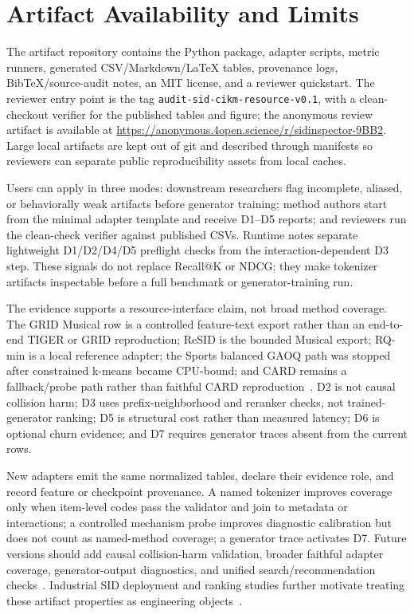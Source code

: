 \section{Artifact Availability and Limits}

The artifact repository contains the \tool Python package, adapter scripts,
metric runners, generated CSV/Markdown/\LaTeX{} tables, provenance logs,
BibTeX/source-audit notes, an MIT license, and a reviewer quickstart. The
reviewer entry point is the tag
\texttt{audit-sid-cikm-resource-v0.1}, with a clean-checkout verifier for the
published tables and figure; the anonymous review artifact is available at
\url{https://anonymous.4open.science/r/sidinspector-9BB2}. Large local artifacts are kept out of git and
described through manifests so reviewers can separate public reproducibility
assets from local caches.

Users can apply \tool in three modes: downstream researchers flag incomplete,
aliased, or behaviorally weak artifacts before generator training; method
authors start from the minimal adapter template and receive D1--D5 reports; and
reviewers run the clean-check verifier against published CSVs. Runtime notes
separate lightweight D1/D2/D4/D5 preflight checks from the interaction-dependent
D3 step. These signals do not replace Recall@K or NDCG; they make tokenizer
artifacts inspectable before a full benchmark or generator-training run.

The evidence supports a resource-interface claim, not broad method coverage.
The GRID Musical row is a controlled feature-text export rather than an
end-to-end TIGER or GRID reproduction; ReSID is the bounded Musical export;
RQ-min is a local reference adapter; the Sports balanced GAOQ path was stopped
after constrained k-means became CPU-bound; and CARD remains a fallback/probe
path rather than faithful CARD reproduction~\cite{wei2026card}. D2 is not
causal collision harm; D3 uses prefix-neighborhood and reranker checks, not
trained-generator ranking; D5 is structural cost rather than measured latency;
D6 is optional churn evidence; and D7 requires generator traces absent from the
current rows.

New adapters emit the same normalized tables, declare their evidence role, and
record feature or checkpoint provenance. A named tokenizer improves coverage
only when item-level codes pass the validator and join to metadata or
interactions; a controlled mechanism probe improves diagnostic calibration but
does not count as named-method coverage; a generator trace activates D7.
Future versions should add causal collision-harm validation, broader faithful
adapter coverage, generator-output diagnostics, and unified search/recommendation
checks~\cite{li2024survey,penha2025jointsid}. Industrial SID deployment and
ranking studies further motivate treating these artifact properties as
engineering objects~\cite{singh2023bettersemanticids,li2026sidcoord,ju2026snapchatsid}.
